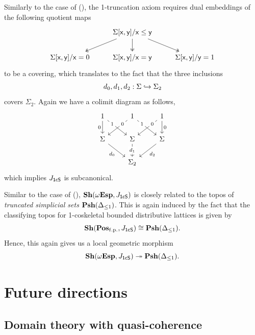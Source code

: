 \begin{example}[\AxiomOneCS]\label{exm:model1T}
  Similarly to the case of (\AxiomSL), the 1-truncation axiom requires dual embeddings of the following quotient maps
  \[\begin{tikzcd}
    & {\Sigma[\ms{x},\ms{y}]/\ms{x}\le\ms{y}} \\
    {\Sigma[\ms{x},\ms{y}]/\ms{x}=0} & {\Sigma[\ms{x},\ms{y}]/\ms{x}=\ms{y}} & {\Sigma[\ms{x},\ms{y}]/\ms{y}=1}
    \arrow[two heads, from=1-2, to=2-1]
    \arrow[two heads, from=1-2, to=2-2]
    \arrow[two heads, from=1-2, to=2-3]
  \end{tikzcd}\]
  to be a covering, which translates to the fact that the three inclusions
  \[ d_0,d_1,d_2 : \Sigma \hookrightarrow \Sigma_2 \]
  covers $\Sigma_2$. Again we have a colimit diagram as follows, 
  \[\begin{tikzcd}
    1 & 1 & 1 \\
    \Sigma & \Sigma & \Sigma \\
    & {\Sigma_2}
    \arrow["0"', from=1-1, to=2-1]
    \arrow["1"{description, pos=0.25}, from=1-1, to=2-2]
    \arrow["0"{description, pos=0.25}, from=1-2, to=2-1]
    \arrow["1"{description, pos=0.25}, from=1-2, to=2-3]
    \arrow["0"{description, pos=0.25}, from=1-3, to=2-2]
    \arrow["0", from=1-3, to=2-3]
    \arrow["{d_0}"', from=2-1, to=3-2]
    \arrow["{d_1}"{description}, from=2-2, to=3-2]
    \arrow["{d_2}", from=2-3, to=3-2]
  \end{tikzcd}\]
  which implies $J_{\mathsf{1cS}}$ is subcanonical.
  
  Similar to the case of (\AxiomSL), $\mathbf{Sh}(\omega\mathbf{Esp},J_{\mathsf{1cS}})$ is closely related to the topos of \emph{truncated simplicial sets} $\mathbf{Psh}(\Delta_{\le 1})$. This is again induced by the fact that the classifying topos for 1-coskeletal bounded distributive lattices is given by 
  \[ \sh(\Pos\fp,J_{\ms{1cS}}) \cong \psh(\Delta_{\le 1})\text{.} \]
  Hence, this again gives us a local geometric morphism
  \[ \sh(\wTop,J_{\ms{1cS}}) \surj \psh(\Delta_{\le 1})\text{.} \]
\end{example}


\section{Future directions}

\subsection{Domain theory with quasi-coherence}

